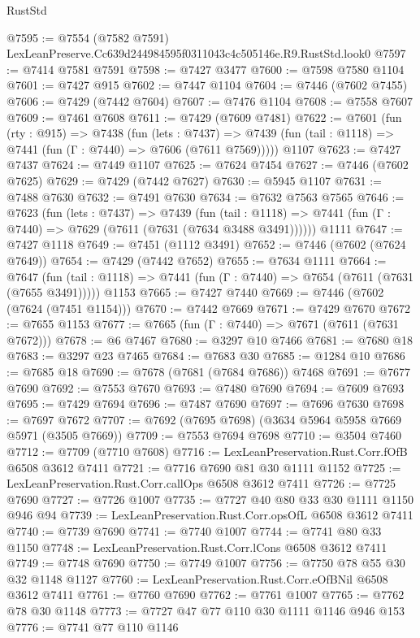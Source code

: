 \begin{lexlean}{RustStd}
\begin{coremodule}
@7595 := @7554 (@7582 @7591) LexLeanPreserve.Cc639d244984595f0311043c4c505146e.R9.RustStd.look0
@7597 := @7414 @7581 @7591
@7598 := @7427 @3477
@7600 := @7598 @7580 @1104
@7601 := @7427 @915
@7602 := @7447 @1104
@7604 := @7446 (@7602 @7455)
@7606 := @7429 (@7442 @7604)
@7607 := @7476 @1104
@7608 := @7558 @7607
@7609 := @7461 @7608
@7611 := @7429 (@7609 @7481)
@7622 := @7601
    (fun (rty : @915) =>
    @7438
      (fun (lets : @7437) =>
      @7439 (fun (tail : @1118) => @7441 (fun (Γ : @7440) => @7606 (@7611 @7569)))))
    @1107
@7623 := @7427 @7437
@7624 := @7449 @1107
@7625 := @7624 @7454
@7627 := @7446 (@7602 @7625)
@7629 := @7429 (@7442 @7627)
@7630 := @5945 @1107
@7631 := @7488 @7630
@7632 := @7491 @7630
@7634 := @7632 @7563 @7565
@7646 := @7623
    (fun (lets : @7437) =>
    @7439
      (fun (tail : @1118) => @7441 (fun (Γ : @7440) => @7629 (@7611 (@7631 (@7634 @3488 @3491))))))
    @1111
@7647 := @7427 @1118
@7649 := @7451 (@1112 @3491)
@7652 := @7446 (@7602 (@7624 @7649))
@7654 := @7429 (@7442 @7652)
@7655 := @7634 @1111
@7664 := @7647
    (fun (tail : @1118) => @7441 (fun (Γ : @7440) => @7654 (@7611 (@7631 (@7655 @3491)))))
    @1153
@7665 := @7427 @7440
@7669 := @7446 (@7602 (@7624 (@7451 @1154)))
@7670 := @7442 @7669
@7671 := @7429 @7670
@7672 := @7655 @1153
@7677 := @7665 (fun (Γ : @7440) => @7671 (@7611 (@7631 @7672)))
@7678 := @6 @7467
@7680 := @3297 @10 @7466
@7681 := @7680 @18
@7683 := @3297 @23 @7465
@7684 := @7683 @30
@7685 := @1284 @10
@7686 := @7685 @18
@7690 := @7678 (@7681 (@7684 @7686)) @7468
@7691 := @7677 @7690
@7692 := @7553 @7670
@7693 := @7480 @7690
@7694 := @7609 @7693
@7695 := @7429 @7694
@7696 := @7487 @7690
@7697 := @7696 @7630
@7698 := @7697 @7672
@7707 := @7692 (@7695 @7698) (@3634 @5964 @5958 @7669 @5971 (@3505 @7669))
@7709 := @7553 @7694 @7698
@7710 := @3504 @7460
@7712 := @7709 (@7710 @7608)
@7716 := LexLeanPreservation.Rust.Corr.fOfB @6508 @3612 @7411
@7721 := @7716 @7690 @81 @30 @1111 @1152
@7725 := LexLeanPreservation.Rust.Corr.callOps @6508 @3612 @7411
@7726 := @7725 @7690
@7727 := @7726 @1007
@7735 := @7727 @40 @80 @33 @30 @1111 @1150 @946 @94
@7739 := LexLeanPreservation.Rust.Corr.opsOfL @6508 @3612 @7411
@7740 := @7739 @7690
@7741 := @7740 @1007
@7744 := @7741 @80 @33 @1150
@7748 := LexLeanPreservation.Rust.Corr.lCons @6508 @3612 @7411
@7749 := @7748 @7690
@7750 := @7749 @1007
@7756 := @7750 @78 @55 @30 @32 @1148 @1127
@7760 := LexLeanPreservation.Rust.Corr.eOfBNil @6508 @3612 @7411
@7761 := @7760 @7690
@7762 := @7761 @1007
@7765 := @7762 @78 @30 @1148
@7773 := @7727 @47 @77 @110 @30 @1111 @1146 @946 @153
@7776 := @7741 @77 @110 @1146

\end{coremodule}
\end{lexlean}
